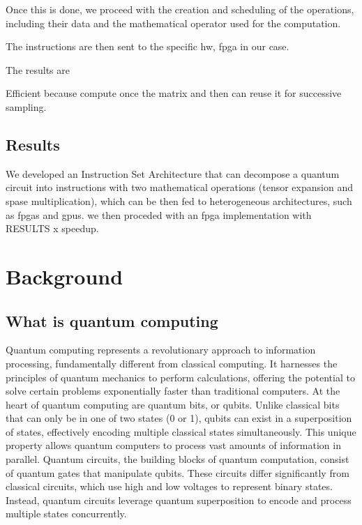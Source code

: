 \documentclass[12pt,oneside,a4paper]{article}
\begin{document}
Once this is done, we proceed with the creation and scheduling of the operations, including their data and the mathematical operator used for the computation.

The instructions are then sent to the specific hw, fpga in our case.

The results are 

Efficient because compute once the matrix and then can reuse it for successive sampling.

\subsection{Results}
We developed an Instruction Set Architecture that can decompose a quantum circuit into instructions with two mathematical operations (tensor expansion and spase multiplication), which can be then fed to heterogeneous architectures, such as fpgas and gpus. we then proceded with an fpga implementation with RESULTS x speedup.



\section{Background}

\subsection{What is quantum computing}
Quantum computing represents a revolutionary approach to information processing, fundamentally different from classical computing. It harnesses the principles of quantum mechanics to perform calculations, offering the potential to solve certain problems exponentially faster than traditional computers.
At the heart of quantum computing are quantum bits, or qubits. Unlike classical bits that can only be in one of two states (0 or 1), qubits can exist in a superposition of states, effectively encoding multiple classical states simultaneously. This unique property allows quantum computers to process vast amounts of information in parallel.
Quantum circuits, the building blocks of quantum computation, consist of quantum gates that manipulate qubits. These circuits differ significantly from classical circuits, which use high and low voltages to represent binary states. Instead, quantum circuits leverage quantum superposition to encode and process multiple states concurrently.
\end{document}
